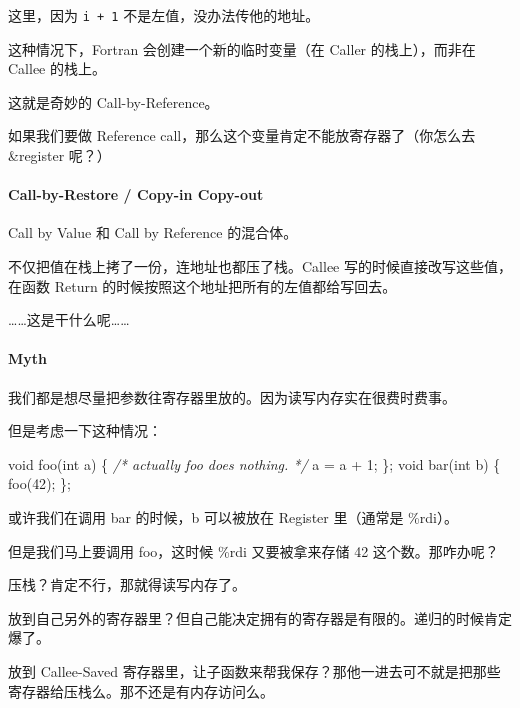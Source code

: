 \documentclass[
]{article}
\newenvironment{Shaded}{}{}
\newcommand{\CommentTok}[1]{\textcolor[rgb]{0.38,0.63,0.69}{\textit{#1}}}
\newcommand{\DataTypeTok}[1]{\textcolor[rgb]{0.56,0.13,0.00}{#1}}
\newcommand{\DecValTok}[1]{\textcolor[rgb]{0.25,0.63,0.44}{#1}}
\newcommand{\NormalTok}[1]{#1}
\begin{document}
这里，因为 \texttt{i\ +\ 1} 不是左值，没办法传他的地址。

这种情况下，Fortran 会创建一个新的临时变量（在 Caller 的栈上），而非在
Callee 的栈上。

这就是奇妙的 Call-by-Reference。

如果我们要做 Reference call，那么这个变量肯定不能放寄存器了（你怎么去
\&register 呢？）

\hypertarget{header-n235}{%
\paragraph{Call-by-Restore / Copy-in Copy-out}\label{header-n235}}

Call by Value 和 Call by Reference 的混合体。

不仅把值在栈上拷了一份，连地址也都压了栈。Callee
写的时候直接改写这些值，在函数 Return
的时候按照这个地址把所有的左值都给写回去。

\ldots\ldots 这是干什么呢\ldots\ldots{}

\hypertarget{header-n239}{%
\paragraph{Myth}\label{header-n239}}

我们都是想尽量把参数往寄存器里放的。因为读写内存实在很费时费事。

但是考虑一下这种情况：

\begin{Shaded}
\begin{Highlighting}[]
\DataTypeTok{void}\NormalTok{ foo(}\DataTypeTok{int}\NormalTok{ a) \{}
    \CommentTok{/* actually foo does nothing. */}
\NormalTok{    a = a + }\DecValTok{1}\NormalTok{;}
\NormalTok{\};}
\DataTypeTok{void}\NormalTok{ bar(}\DataTypeTok{int}\NormalTok{ b) \{}
\NormalTok{    foo(}\DecValTok{42}\NormalTok{);}
\NormalTok{\};}
\end{Highlighting}
\end{Shaded}

或许我们在调用 bar 的时候，b 可以被放在 Register 里（通常是 \%rdi）。

但是我们马上要调用 foo，这时候 \%rdi 又要被拿来存储 42
这个数。那咋办呢？

压栈？肯定不行，那就得读写内存了。

放到自己另外的寄存器里？但自己能决定拥有的寄存器是有限的。递归的时候肯定爆了。

放到 Callee-Saved
寄存器里，让子函数来帮我保存？那他一进去可不就是把那些寄存器给压栈么。那不还是有内存访问么。
\end{document}
